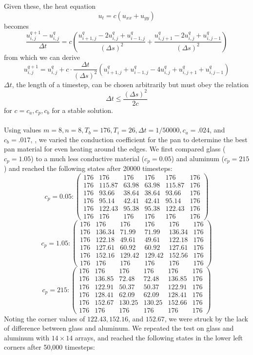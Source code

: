 \documentclass[12pt]{reedmcm}
\begin{document}
Given these, the heat equation
\[u_t = c (u_{xx} + u_{yy})\]
becomes
\[\dfrac{u_{i,j}^{q+1} - u_{i,j}^q}{\Delta t} = c  \left(\dfrac{u_{i+1,j}^q - 2u_{i,j}^q + u_{i-1,j}^q}{(\Delta s)^2} + \dfrac{u_{i,j+1}^q - 2u_{i,j}^q + u_{i,j-1}^q}{(\Delta s)^2}\right)\]
from which we can derive
\[u_{i,j}^{q+1} = u_{i,j}^q + c \cdot \frac{\Delta t}{(\Delta s)^2} \left(u_{i+1,j}^q + u_{i-1,j}^q - 4u_{i,j}^q + u_{i,j+1}^q + u_{i,j-1}^q \right)\]
$\Delta t$, the length of a timestep, can be chosen arbitrarily but must obey the relation
\[\Delta t \leq \frac{(\Delta s)^2}{2c}\]
for $c = c_a,c_p,c_b$ for a stable solution.\\
\\
Using values $m = 8, n=8, T_b = 176, T_i = 26, \Delta t = 1/50000, c_a = .024$, and $c_b = .017$, , we varied the conduction coefficient for the pan to determine the best pan material for even heating around the edges.  We first compared glass ($c_p = 1.05$) to a much less conductive material ($c_p = 0.05$) and aluminum ($c_p = 215$) and reached the following states after 20000 timesteps:
\[c_p = 0.05: \begin{pmatrix} 176&176&176&176&176&176\\
						176&115.87&63.98&63.98&115.87&176\\
						176&93.66&38.64&38.64&93.66&176\\
						176&95.14&42.41&42.41&95.14&176\\
						176&122.43&95.38&95.38&122.43&176\\
					        176&176&176&176&176&176 \end{pmatrix}\] 
\[c_p = 1.05: \begin{pmatrix} 176&176&176&176&176&176\\
						176&136.34&71.99&71.99&136.34&176\\
						176&122.18&49.61&49.61&122.18&176\\
						176&127.61&60.92&60.92&127.61&176\\
						176&152.16&129.42&129.42&152.56&176\\
					        176&176&176&176&176&176 \end{pmatrix}\]
\[c_p = 215: \begin{pmatrix} 176&176&176&176&176&176\\
						176&136.85&72.48&72.48&136.85&176\\
						176&122.91&50.37&50.37&122.91&176\\
						176&128.41&62.09&62.09&128.41&176\\
						176&152.67&130.25&130.25&152.66&176\\
					        176&176&176&176&176&176 \end{pmatrix}\]
Noting the corner values of $122.43, 152.16$, and $152.67$, we were struck by the lack of difference between glass and aluminum.  We repeated the test on glass and aluminum with $14 \times 14$ arrays, and reached the following states in the lower left corners after 50,000 timesteps:
\end{document}
